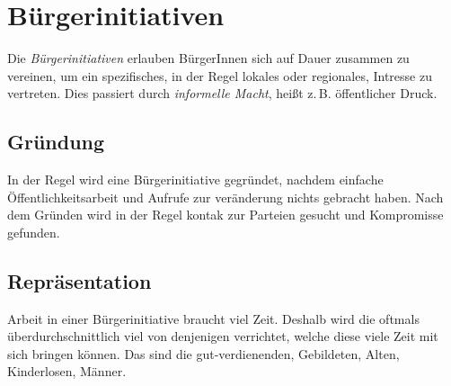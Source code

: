 \documentclass{article}
\begin{document}
\section{Bürgerinitiativen}
Die \emph{Bürgerinitiativen} erlauben BürgerInnen sich auf Dauer zusammen zu vereinen, um ein spezifisches, in der Regel lokales oder regionales, Intresse zu vertreten. Dies passiert durch \emph{informelle Macht}, heißt z.\,B. öffentlicher Druck.
 
\subsection{Gründung} 
In der Regel wird eine Bürgerinitiative gegründet, nachdem einfache Öffentlichkeitsarbeit und Aufrufe zur veränderung nichts gebracht haben. Nach dem Gründen wird in der Regel kontak zur Parteien gesucht und Kompromisse gefunden.
 
\subsection{Repräsentation} 
Arbeit in einer Bürgerinitiative braucht viel Zeit. Deshalb wird die oftmals überdurchschnittlich viel von denjenigen verrichtet, welche diese viele Zeit mit sich bringen können. Das sind die gut-verdienenden, Gebildeten, Alten, Kinderlosen, Männer. 
\end{document}
